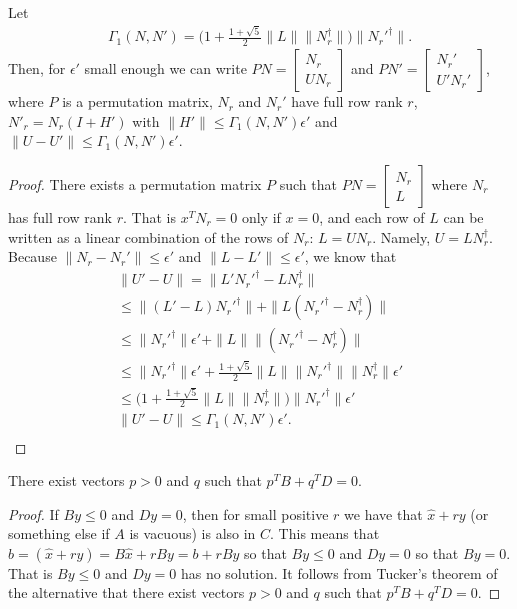 \begin{theorem}
\label{3_4}
Let 
\begin{align*}
\Gamma_1(N, N') = \bigg(1 + \frac{1+\sqrt{5}}{2}\|L\| \|N_r^{\dagger}\|\bigg)\|{N_r'}^{\dagger}\|.
\end{align*}
Then, for $\epsilon'$ small enough we can write $PN = \begin{bmatrix} N_r \\ UN_r \end{bmatrix}$ and $PN' = \begin{bmatrix} N_r' \\ U'N_r' \end{bmatrix}$, where $P$ is a permutation matrix, $N_r$ and $N_r'$ have full row rank $r$, $N'_r = N_r(I + H')$ with $\|H'\|\le \Gamma_1(N, N') \epsilon'$ and $\|U - U'\| \le \Gamma_1(N, N')\epsilon'$.
\end{theorem}

\begin{proof}
There exists a permutation matrix $P$ such that $PN = \begin{bmatrix}N_r \\ L \end{bmatrix}$ where $N_r$ has full  row rank $r$.
That is $x^T N_r = 0$ only if $x = 0$, and each row of $L$ can be written as a linear combination of the rows of $N_r$: $L = UN_r$.
Namely, $U = L N_r^{\dagger}$.
Because $\|N_r - N_r'\| \le \epsilon'$ and $\|L - L'\| \le \epsilon'$, we know that 
\begin{align*}
\|U' - U\| = \|L'{N_r'}^{\dagger} - LN_r^{\dagger}\| \\
\le \|(L' - L){N_r'}^{\dagger}\| + \| L({N_r'}^{\dagger} - N_r^{\dagger})\| \\
\le \|{N_r'}^{\dagger}\|\epsilon' + \|L\| \|({N_r'}^{\dagger} - N_r^{\dagger})\| \\
\le \|{N_r'}^{\dagger}\|\epsilon' + \frac{1+\sqrt{5}}{2}\|L\| \|{N_r'}^{\dagger}\|\|N_r^{\dagger}\|\epsilon' \\
\le \bigg(1 + \frac{1+\sqrt{5}}{2}\|L\| \|N_r^{\dagger}\|\bigg)\|{N_r'}^{\dagger}\|\epsilon' \\
\|U' - U\| \le \Gamma_1(N, N') \epsilon'. \\
\end{align*}

\end{proof}

\begin{theorem}
\label{remarks}
There exist vectors $p > 0$ and $q$ such that $p^TB + q^TD = 0$.
\end{theorem}
\begin{proof}
If $By \le 0$ and $Dy = 0$, then for small positive $r$ we have that $\hat x + ry$ (or something else if $A$ is vacuous) is also in $C$.
This means that $b = (\hat x + ry) = B\hat x + rBy = b + rBy$ so that $By \le 0 $ and $Dy = 0$ so that $By = 0$.
That is $By\le 0$ and  $Dy = 0$ has no solution.
It follows from Tucker's theorem of the alternative that there exist vectors $p > 0$ and $q$ such that $p^TB + q^TD = 0$.
\end{proof}


